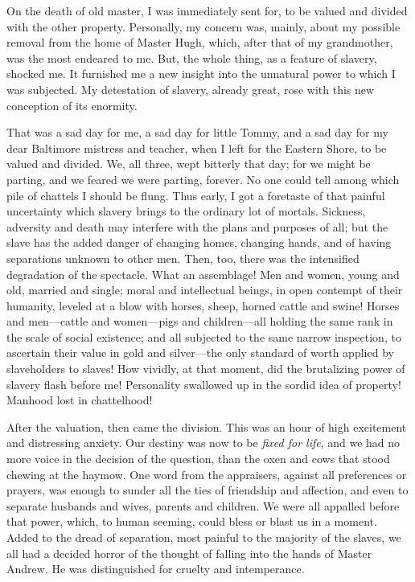 On the death of old master, I was immediately sent for, to be valued and
divided with the other property. Personally, my concern was, mainly,
about my possible removal from the home of Master Hugh, which, after
that of my grandmother, was the most endeared to me. But, the whole
thing, as a feature of slavery, shocked me. It furnished me a new
insight into the unnatural power to which I was subjected. My
detestation of slavery, already great, rose with this new conception of
its enormity.

That was a sad day for me, a sad day for little Tommy, and a sad day for
my dear Baltimore mistress and teacher, when I left for the Eastern
Shore, to be valued and divided. We, all three, wept bitterly that
{\protect\hypertarget{175}{}{}}day; for we might be parting, and we
feared we were parting, forever. No one could tell among which pile of
chattels I should be flung. Thus early, I got a foretaste of that
painful uncertainty which slavery brings to the ordinary lot of mortals.
Sickness, adversity and death may interfere with the plans and purposes
of all; but the slave has the added danger of changing homes, changing
hands, and of having separations unknown to other men. Then, too, there
was the intensified degradation of the spectacle. What an assemblage!
Men and women, young and old, married and single; moral and intellectual
beings, in open contempt of their humanity, leveled at a blow with
horses, sheep, horned cattle and swine! Horses and men---cattle and
women---pigs and children---all holding the same rank in the scale of
social existence; and all subjected to the same narrow inspection, to
ascertain their value in gold and silver---the only standard of worth
applied by slaveholders to slaves! How vividly, at that moment, did the
brutalizing power of slavery flash before me! Personality swallowed up
in the sordid idea of property! Manhood lost in chattelhood!

After the valuation, then came the division. This was an hour of high
excitement and distressing anxiety. Our destiny was now to be
\emph{fixed for life}, and we had no more voice in the decision of the
question, than the oxen and cows that stood chewing at the haymow. One
word from the appraisers, against all preferences or prayers, was enough
to sunder all the ties of friendship and affection, and even to separate
husbands and wives, parents and children. We were all
{\protect\hypertarget{176}{}{}}appalled before that power, which, to
human seeming, could bless or blast us in a moment. Added to the dread
of separation, most painful to the majority of the slaves, we all had a
decided horror of the thought of falling into the hands of Master
Andrew. He was distinguished for cruelty and intemperance.


